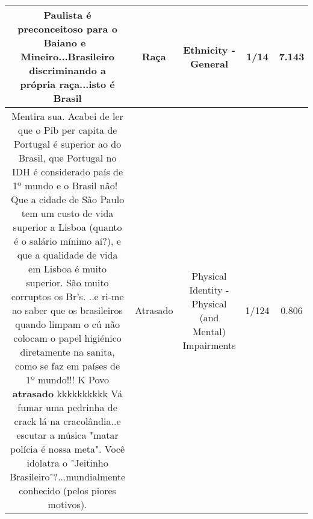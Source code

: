 \documentclass[11pt]{article}
\newlength\mylength
\begin{document}
\begin{center}
\begin{longtable}{|C{.65\mylength}|C{.30\mylength}|C{.12\mylength}|C{.12\mylength}|C{.12\mylength}|}
  \small Paulista é preconceitoso para o Baiano e  Mineiro...Brasileiro discriminando a própria \textbf{raça}...isto é Brasil\normalsize   & Raça & Ethnicity - General & 1/14 & 7.143 \\  \hline
  \small Mentira sua. Acabei de ler que o Pib per capita de Portugal é superior ao do Brasil, que Portugal no IDH é considerado país de 1º mundo e o Brasil não!  Que a cidade de São Paulo tem um custo de vida superior a Lisboa (quanto é o salário mínimo aí?), e que a qualidade de vida em Lisboa é muito superior. São muito corruptos os Br's. ..e ri-me ao saber que os brasileiros quando limpam o cú não colocam o papel higiénico diretamente na sanita, como se faz em países de 1º mundo!!! K Povo \textbf{atrasado} kkkkkkkkkk Vá fumar uma pedrinha de crack lá na cracolândia..e escutar a música "matar polícia é nossa meta". Você idolatra o "Jeitinho Brasileiro"?...mundialmente conhecido (pelos piores motivos).\normalsize   & Atrasado & Physical Identity - Physical (and Mental) Impairments & 1/124 & 0.806 \\  \hline

\end{longtable}
\end{center}
\end{document}
